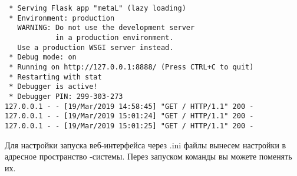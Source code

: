 \smallskip
{}

\begin{verbatim}
 * Serving Flask app "metaL" (lazy loading)
 * Environment: production
   WARNING: Do not use the development server
            in a production environment.
   Use a production WSGI server instead.
 * Debug mode: on
 * Running on http://127.0.0.1:8888/ (Press CTRL+C to quit)
 * Restarting with stat
 * Debugger is active!
 * Debugger PIN: 299-303-273
127.0.0.1 - - [19/Mar/2019 14:58:45] "GET / HTTP/1.1" 200 -
127.0.0.1 - - [19/Mar/2019 15:01:24] "GET / HTTP/1.1" 200 -
127.0.0.1 - - [19/Mar/2019 15:01:25] "GET / HTTP/1.1" 200 -
\end{verbatim}


Для настройки запуска веб-интерфейса через .ini файлы вынесем настройки в
адресное пространство \F-системы. Перез запуском команды  вы можете
поменять их.

\medskip
{}







\secup
